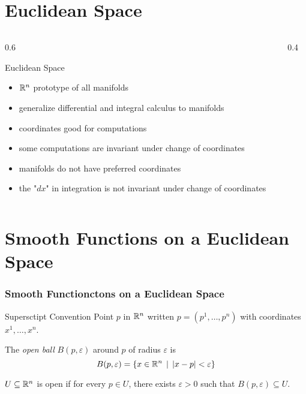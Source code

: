 
% 


\section{Euclidean Space}
\begin{frame}
\begin{columns}
  \begin{column}
    {0.6\textwidth}
    \begin{block}
      {Euclidean Space}
      \begin{itemize}
        \item \(\mathbb R^n\) prototype of all manifolds
        \item generalize differential and integral calculus to manifolds 
        \item coordinates good for computations
        \item some computations are invariant under change of coordinates
        \item manifolds do not have preferred coordinates
        \item the "$dx$" in integration is not invariant under change of coordinates
      \end{itemize}
    \end{block}
  \end{column}
  \begin{column}
    {0.4\textwidth}
  \end{column}
\end{columns}
\section{Smooth Functions on a Euclidean Space}

\end{frame}
\begin{frame}
  \frametitle{Smooth Functionctons on a Euclidean Space}
  \begin{block}
    {Supersctipt Convention}
    Point $p$ in $\mathbb R^n$ written $p = (p^1, \dots, p^n)$ with 
    coordinates $x^1, \dots, x^n$.
  \end{block}
  \begin{definition}
    The {\em open ball} $B(p, \varepsilon)$ around $p$ of radius $\varepsilon$ is
    \begin{displaymath}
      B(p, \varepsilon) = \{x \in \mathbb R^n \, \mid \, |x - p| < \varepsilon\}
    \end{displaymath}
  \end{definition}
  \begin{definition}
    $U \subseteq \mathbb R^n$ is open if for every $p \in U$, there exists
    $\varepsilon > 0$ such that $B(p, \varepsilon) \subseteq U$.
  \end{definition}
\end{frame}
